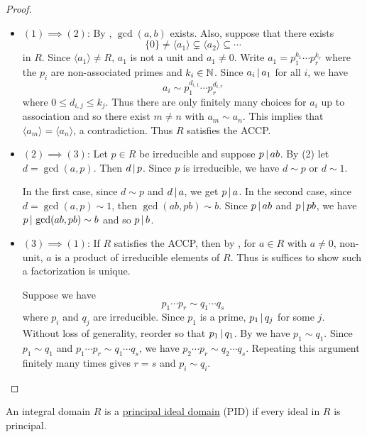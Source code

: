 \documentclass[11pt]{article}
\begin{document}
\begin{proof}\,
    \begin{itemize}
        \item$(1)\implies(2)$: By , $\gcd(a,b)$ exists. Also, suppose that there exists
        \[\{0\}\neq\langle a_1\rangle\subsetneq\langle a_2\rangle\subseteq\cdots\]
        in $R$. Since $\langle a_1\rangle\neq R$, $a_1$ is not a unit and $a_1\neq0$. Write $a_1=p_1^{k_1}\cdots p_r^{k_r}$ where the $p_i$ are non-associated primes and $k_i\in\mathbb{N}$. Since $a_i\,|\, a_1$ for all $i$, we have
        \[a_i\sim p_1^{d_{i,1}}\cdots p_r^{d_{i,r}}\]
        where $0\leq d_{i,j}\leq k_j$. Thus there are only finitely many choices for $a_i$ up to association and so there exist $m\neq n$ with $a_m\sim a_n$. This implies that $\langle a_m\rangle=\langle a_n\rangle$, a contradiction. Thus $R$ satisfies the ACCP.

        \item$(2)\implies(3)$: Let $p\in R$ be irreducible and suppose $p\,|\, ab$. By (2) let $d=\gcd(a,p)$. Then $d\,|\, p$. Since $p$ is irreducible, we have $d\sim p$ or $d\sim 1$.

        In the first case, since $d\sim p$ and $d\,|\, a$, we get $p\,|\, a$. In the second case, since $d=\gcd(a,p)\sim1$, then $\gcd(ab,pb)\sim b$. Since $p\,|\, ab$ and $p\,|\, pb$, we have $p\,|\, \gcd(ab,pb)\sim b$ and so $p\,|\, b$.

        \item$(3)\implies(1)$: If $R$ satisfies the ACCP, then by , for $a\in R$ with $a\neq0$, non-unit, $a$ is a product of irreducible elements of $R$. Thus is suffices to show such a factorization is unique.

        Suppose we have
        \[p_1\cdots p_r\sim q_1\cdots q_s\]
        where $p_i$ and $q_j$ are irreducible. Since $p_1$ is a prime, $p_1\,|\, q_j$ for some $j$. Without loss of generality, reorder so that $p_1\,|\, q_1$. By  we have $p_1\sim q_1$. Since $p_1\sim q_1$ and $p_1\cdots p_r\sim q_1\cdots q_s$, we have $p_2\cdots p_r\sim q_2\cdots q_s$. Repeating this argument finitely many times gives $r=s$ and $p_i\sim q_i$.
    \end{itemize}
\end{proof}

\begin{definition}
    An integral domain $R$ is a \ul{principal ideal domain} (PID) if every ideal in $R$ is principal. 
\end{definition}
\end{document}
